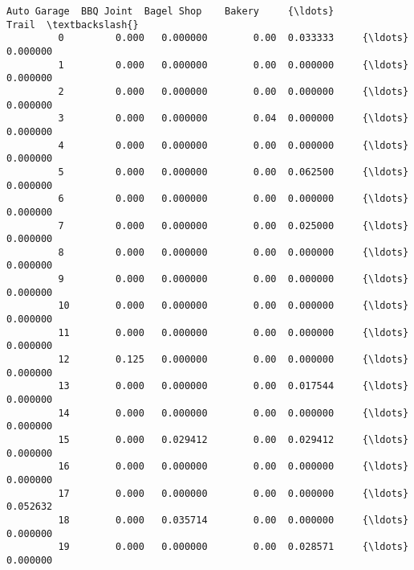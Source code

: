 \documentclass[11pt]{article}
\begin{document}
\begin{Verbatim}[commandchars=\\\{\}]
             Auto Garage  BBQ Joint  Bagel Shop    Bakery     {\ldots}          Trail  \textbackslash{}
         0         0.000   0.000000        0.00  0.033333     {\ldots}       0.000000   
         1         0.000   0.000000        0.00  0.000000     {\ldots}       0.000000   
         2         0.000   0.000000        0.00  0.000000     {\ldots}       0.000000   
         3         0.000   0.000000        0.04  0.000000     {\ldots}       0.000000   
         4         0.000   0.000000        0.00  0.000000     {\ldots}       0.000000   
         5         0.000   0.000000        0.00  0.062500     {\ldots}       0.000000   
         6         0.000   0.000000        0.00  0.000000     {\ldots}       0.000000   
         7         0.000   0.000000        0.00  0.025000     {\ldots}       0.000000   
         8         0.000   0.000000        0.00  0.000000     {\ldots}       0.000000   
         9         0.000   0.000000        0.00  0.000000     {\ldots}       0.000000   
         10        0.000   0.000000        0.00  0.000000     {\ldots}       0.000000   
         11        0.000   0.000000        0.00  0.000000     {\ldots}       0.000000   
         12        0.125   0.000000        0.00  0.000000     {\ldots}       0.000000   
         13        0.000   0.000000        0.00  0.017544     {\ldots}       0.000000   
         14        0.000   0.000000        0.00  0.000000     {\ldots}       0.000000   
         15        0.000   0.029412        0.00  0.029412     {\ldots}       0.000000   
         16        0.000   0.000000        0.00  0.000000     {\ldots}       0.000000   
         17        0.000   0.000000        0.00  0.000000     {\ldots}       0.052632   
         18        0.000   0.035714        0.00  0.000000     {\ldots}       0.000000   
         19        0.000   0.000000        0.00  0.028571     {\ldots}       0.000000   
         

\end{Verbatim}
\end{document}
